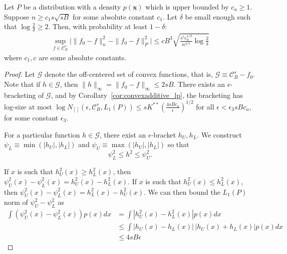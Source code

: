 \begin{lemma}
\label{lem:uniform_convergence}
Let $P$ be a distribution with a density $p(\mathbf{x})$ which is upper bounded by $c_u \geq 1$. Suppose $n \geq c_1 s\sqrt{sB}$ for some absolute constant $c_1$. Let $\delta$ be small enough such that $\log \frac{2}{\delta} \geq 2$. Then, with probability at least $1-\delta$:
\begin{align*}
\sup_{f \in \mathcal{C}^s_B} \Big| \| f_0 - f \|^2_n - \|f_0 - f \|^2_P\Big| \leq
   c B^3 \sqrt{ \frac{s^5c_u^{1/2}}{n^{4/5}} \log \frac{2}{\delta}}
\end{align*}
where $c_1, c$ are some absolute constants.
\end{lemma}

\begin{proof}
Let $\mathcal{G}$ denote the off-centered set of convex functions, that is, $\mathcal{G} \equiv \mathcal{C}^s_B - f_0$. Note that if $h \in \mathcal{G}$, then $\| h \|_\infty = \| f_0 - f \|_\infty \leq 2 s B$.
There exists an $\epsilon$-bracketing of $\mathcal{G}$, and
by Corollary~\ref{cor:convexadditive_lp}, the bracketing has log-size at most $\log N_{[]}(\epsilon, \mathcal{C}^s_B, L_1(P)) \leq s K^{**}\left( \frac{4sBc_u}{\epsilon} \right)^{1/2}$ for all $\epsilon < \epsilon_3 s B c_u$, for some constant $\epsilon_3$. 

For a particular function $h \in \mathcal{G}$, there exist an $\epsilon$-bracket $h_U, h_L$. We construct $\psi_L \equiv \min( |h_U|, |h_L|)$ and $\psi_U \equiv \max( |h_U|, |h_L| )$ so that
\[
\psi_L^2 \leq h^2 \leq \psi_U^2.
\]

If $x$ is such that $h^2_U(x) \geq h^2_L(x)$, then $\psi_U^2(x) - \psi_L^2(x) = h^2_U(x) - h^2_L(x)$. If $x$ is such that $h^2_U(x) \leq h^2_L(x)$, then $\psi_U^2(x) - \psi_L^2(x) = h^2_L(x) - h_U^2(x)$. We can then bound the $L_1(P)$ norm of $\psi_U^2 - \psi_L^2$ as
\begin{align*}
\int (\psi_U^2(x) - \psi_L^2(x)) p(x)dx  &=  \int | h_U^2(x) - h_L^2(x)| p(x) dx \\
   &\leq \int | h_U(x) - h_L(x) | \, |h_U(x) + h_L(x)| p(x) dx \\
   &\leq 4sB \epsilon
\end{align*}


\end{proof}
